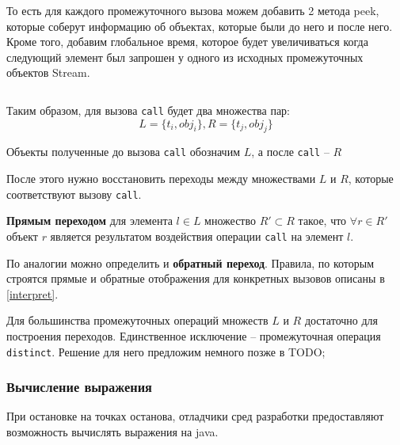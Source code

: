 То есть для каждого промежуточного вызова можем добавить 2 метода peek, которые соберут информацию об объектах, которые были до него и после него. Кроме того, добавим глобальное время, которое будет увеличиваться когда следующий элемент был запрошен у одного из исходных промежуточных объектов Stream.

\inputminted{java}{chapter2/code/LocalChainModification.java}

Таким образом, для вызова \texttt{call} будет два множества пар: 
\begin{equation*}
	L = \{t_i, obj_i\}, R = \{t_j, obj_j\}
\end{equation*}

Объекты полученные до вызова \texttt{call} обозначим $L$, а после \texttt{call} -- $R$

После этого нужно восстановить переходы между множествами $L$ и $R$, которые соответствуют вызову \texttt{call}.

\textbf{Прямым переходом} для элемента $l \in L$ множество $R' \subset R$ такое, что $\forall r \in R'$ объект $r$ является результатом воздействия операции \texttt{call} на элемент $l$.

По аналогии можно определить и \textbf{обратный переход}.
Правила, по которым строятся прямые и обратные отображения для конкретных вызовов описаны в \ref{interpret}.

Для большинства промежуточных операций множеств $L$ и $R$ достаточно для построения переходов. Единственное исключение -- промежуточная операция \texttt{distinct}. Решение для него предложим немного позже в TODO;

\subsubsection{Вычисление выражения}
При остановке на точках останова, отладчики сред разработки предоставляют возможность вычислять выражения на java. 

